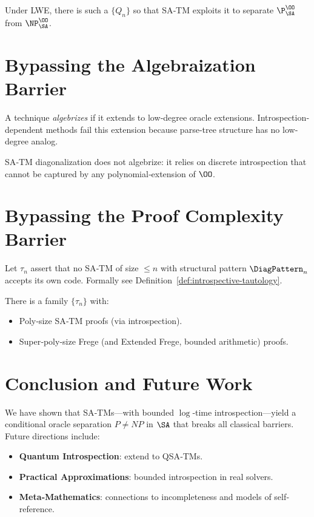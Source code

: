 \documentclass[12pt]{article}
\begin{document}
\begin{lemma}
Under LWE, there is such a $\{Q_n\}$ so that SA‐TM exploits it to separate $\P^{\OO}_{\SA}$ from $\NP^{\OO}_{\SA}$.
\end{lemma}

\section{Bypassing the Algebraization Barrier}
\begin{definition}
A technique \emph{algebrizes} if it extends to low‐degree oracle extensions.  Introspection‐dependent methods fail this extension because parse‐tree structure has no low‐degree analog.
\end{definition}

\begin{theorem}
SA‐TM diagonalization does not algebrize: it relies on discrete introspection that cannot be captured by any polynomial‐extension of $\OO$.
\end{theorem}

\section{Bypassing the Proof Complexity Barrier}
\begin{definition}
Let $\tau_n$ assert that no SA‐TM of size $\le n$ with structural pattern $\DiagPattern_n$ accepts its own code.  Formally see Definition~\ref{def:introspective-tautology}.
\end{definition}

\begin{theorem}
There is a family $\{\tau_n\}$ with:
\begin{itemize}
  \item Poly‐size SA‐TM proofs (via introspection).
  \item Super‐poly‐size Frege (and Extended Frege, bounded arithmetic) proofs.
\end{itemize}
\end{theorem}

\section{Conclusion and Future Work}
We have shown that SA‐TMs—with bounded $\log$‐time introspection—yield a conditional oracle separation $P\neq NP$ in $\SA$ that breaks all classical barriers.  Future directions include:
\begin{itemize}
  \item \textbf{Quantum Introspection}: extend to QSA‐TMs.
  \item \textbf{Practical Approximations}: bounded introspection in real solvers.
  \item \textbf{Meta‐Mathematics}: connections to incompleteness and models of self‐reference.
\end{itemize}



\end{document}

